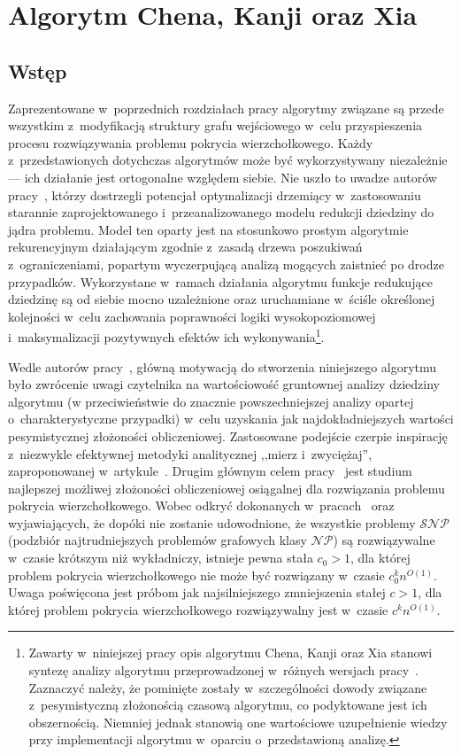 \section{Algorytm Chena, Kanji oraz Xia}\label{s_ckx}
\subsection{Wstęp}
\par{
  Zaprezentowane w~poprzednich rozdziałach pracy algorytmy związane są przede wszystkim z~modyfikacją struktury grafu wejściowego w~celu przyspieszenia procesu rozwiązywania problemu pokrycia wierzchołkowego.
  Każdy z~przedstawionych dotychczas algorytmów może być wykorzystywany niezależnie --- ich działanie jest ortogonalne względem siebie.
  Nie uszło to uwadze autorów pracy~\cite{ImprovedBounds10}, którzy dostrzegli potencjał optymalizacji drzemiący w~zastosowaniu starannie zaprojektowanego i~przeanalizowanego modelu redukcji dziedziny do jądra problemu.
  Model ten oparty jest na stosunkowo prostym algorytmie rekurencyjnym działającym zgodnie z~zasadą drzewa poszukiwań z~ograniczeniami, popartym wyczerpującą analizą mogących zaistnieć po drodze przypadków.
  Wykorzystane w~ramach działania algorytmu funkcje redukujące dziedzinę są od siebie mocno uzależnione oraz uruchamiane w~ściśle określonej kolejności w~celu zachowania poprawności logiki wysokopoziomowej i~maksymalizacji pozytywnych efektów ich wykonywania\footnote{Zawarty w~niniejszej pracy opis algorytmu Chena, Kanji oraz Xia stanowi syntezę analizy algorytmu przeprowadzonej w~różnych wersjach pracy~\cite{ImprovedBounds10}. Zaznaczyć należy, że pominięte zostały w~szczególności dowody związane z~pesymistyczną złożonością czasową algorytmu, co podyktowane jest ich obszernością. Niemniej jednak stanowią one wartościowe uzupełnienie wiedzy przy implementacji algorytmu w~oparciu o~przedstawioną analizę.}.
}
\par{
  Wedle autorów pracy~\cite{ImprovedBounds10}, główną motywacją do stworzenia niniejszego algorytmu było zwrócenie uwagi czytelnika na wartościowość gruntownej analizy dziedziny algorytmu (w przeciwieństwie do znacznie powszechniejszej analizy opartej o~charakterystyczne przypadki) w~celu uzyskania jak najdokładniejszych wartości pesymistycznej złożoności obliczeniowej.
  Zastosowane podejście czerpie inspirację z~niezwykle efektywnej metodyki analitycznej ,,mierz i~zwyciężaj'', zaproponowanej w~artykule~\cite{conf/icalp/FominGK05}.
  Drugim głównym celem pracy~\cite{ImprovedBounds10} jest studium najlepszej możliwej złożoności obliczeniowej osiągalnej dla rozwiązania problemu pokrycia wierzchołkowego.
  Wobec odkryć dokonanych w~pracach~\cite{Impagliazzo2001512} oraz~\cite{Cai2003789} wyjawiających, że dopóki nie zostanie udowodnione, że wszystkie problemy $\mathcal{SNP}$ (podzbiór najtrudniejszych problemów grafowych klasy $\mathcal{NP}$) są rozwiązywalne w~czasie krótszym niż wykładniczy, istnieje pewna stała $c_0 > 1$, dla której problem pokrycia wierzchołkowego nie może być rozwiązany w~czasie $c_0^kn^{O(1)}$.
  Uwaga poświęcona jest próbom jak najsilniejszego zmniejszenia stałej $c > 1$, dla której problem pokrycia wierzchołkowego rozwiązywalny jest w~czasie $c^kn^{O(1)}$.
}
